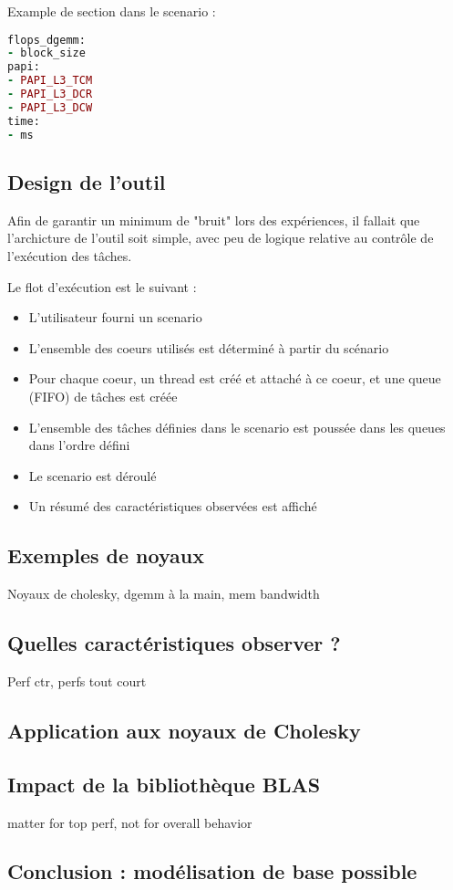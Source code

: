 Example de section dans le scenario :
\begin{lstlisting}[language=Ruby]
flops_dgemm:
- block_size
papi:
- PAPI_L3_TCM
- PAPI_L3_DCR
- PAPI_L3_DCW
time:
- ms
\end{lstlisting}

\subsection{Design de l'outil}

Afin de garantir un minimum de "bruit" lors des expériences, il fallait que l'archicture de l'outil soit simple, avec peu de logique relative au contrôle de l'exécution des tâches.

Le flot d'exécution est le suivant :
\begin{itemize}
 \item L'utilisateur fourni un scenario
 \item L'ensemble des coeurs utilisés est déterminé à partir du scénario
 \item Pour chaque coeur, un thread est créé et attaché à ce coeur, et une queue (FIFO) de tâches est créée
 \item L'ensemble des tâches définies dans le scenario est poussée dans les queues dans l'ordre défini
 \item Le scenario est déroulé
 \item Un résumé des caractéristiques observées est affiché
\end{itemize}

\subsection{Exemples de noyaux}

Noyaux de cholesky, dgemm à la main, mem bandwidth

\subsection{Quelles caractéristiques observer ?}
Perf ctr, perfs tout court

\subsection{Application aux noyaux de Cholesky}
\subsection{Impact de la bibliothèque BLAS}

matter for top perf, not for overall behavior

\subsection{Conclusion : modélisation de base possible}

